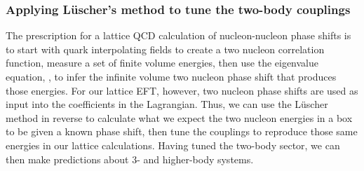 \subsubsection{Applying L\"uscher's method to tune the two-body couplings}
The prescription for a lattice QCD calculation of nucleon-nucleon phase shifts is to start with quark interpolating fields to create a two nucleon correlation function, measure a set of finite volume energies, then use the eigenvalue equation, , to infer the infinite volume two nucleon phase shift that produces those energies. For our lattice EFT, however, two nucleon phase shifts are used as input into the coefficients in the Lagrangian. Thus, we can use the L\"uscher method in reverse to calculate what we expect the two nucleon energies in a box to be given a known phase shift, then tune the couplings to reproduce those same energies in our lattice calculations. Having tuned the two-body sector, we can then make predictions about 3- and higher-body systems.

